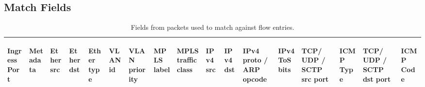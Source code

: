 \documentclass[10pt]{article}
\begin{document}
\subsection{Match Fields}
\begin{table}[hbp]
\centering
\footnotesize
\begin{tabularx}{\textwidth}{ |X|X|X|X|X|X|X|X|X|X|X|X|X|XX|XX| }
\hline
\begin{sideways}Ingress Port \end{sideways} &
\begin{sideways}Metadata \end{sideways} &
\begin{sideways}Ether src \end{sideways} &
\begin{sideways}Ether dst \end{sideways} &
\begin{sideways}Ether type \end{sideways} &
\begin{sideways}VLAN id \end{sideways} &
\begin{sideways}VLAN priority \end{sideways} &
\begin{sideways}MPLS label \end{sideways} &
\begin{sideways}MPLS traffic class \end{sideways} &
\begin{sideways}IPv4 src \end{sideways} &
\begin{sideways}IPv4 dst \end{sideways} &
\begin{sideways}IPv4 proto / ARP opcode \end{sideways} &
\begin{sideways}IPv4 ToS bits \end{sideways} &
\begin{sideways}TCP/ UDP / SCTP src port \end{sideways} &
\begin{sideways}ICMP Type \end{sideways} &
\begin{sideways}TCP/ UDP / SCTP dst port \end{sideways} &
\begin{sideways}ICMP Code \end{sideways}
\\ 
\hline
\end{tabularx}
\caption{Fields from packets used to match against flow entries.}
\label{table:match fields}
\end{table}
\end{document}
